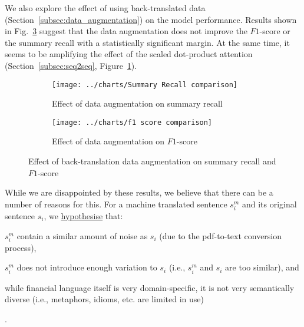 We also explore the effect of using back-translated data (Section~\ref{subsec:data_augmentation}) on the model performance.
Results shown in Fig.~\ref{fig:data_augmentation_effect} suggest that the data augmentation does not improve the $F1$-score or the summary recall with a statistically significant margin.
At the same time, it seems to be amplifying the effect of the scaled dot-product attention (Section~\ref{subsec:seq2seq}, Figure~\ref{fig:summary_recall_data_augmentation_effect}).
\begin{figure}[ht]
    \begin{subfigure}{0.49\textwidth}
        \centering \texttt{[image: ../charts/Summary Recall comparison]}
        \caption{Effect of data augmentation on summary recall}
        \label{fig:summary_recall_data_augmentation_effect}
    \end{subfigure}%
    \hfill
    \begin{subfigure}{0.49\textwidth}
        \centering
        \texttt{[image: ../charts/f1 score comparison]}
        \caption{Effect of data augmentation on $F1$-score}
        \label{fig:f1_score_comparison_data_augmentation_effect}
    \end{subfigure}
    \caption{Effect of back-translation data augmentation on summary recall and $F1$-score}
    \label{fig:data_augmentation_effect}
\end{figure}
While we are disappointed by these results, we believe that there can be a number of reasons for this.
For a machine translated sentence $s^m_i$ and its original sentence $s_i$, we \hyperlink{data_augment_hypothesis}{hypothesise} that:
\begin{enumerate*}
    \item $s^m_i$ contain a similar amount of noise as $s_i$ (due to the pdf-to-text conversion process),
    \item $s^m_i$ does not introduce enough variation to $s_i$ (i.e., $s^m_i$ and $s_i$ are too similar), and
    \item while financial language itself is very domain-specific, it is not very semantically diverse (i.e., metaphors, idioms, etc. are limited in use)
\end{enumerate*}.

